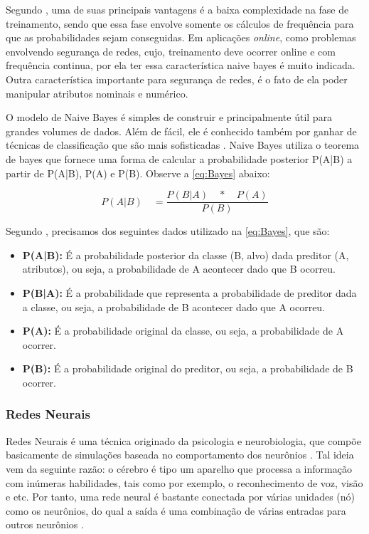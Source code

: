 \par
Segundo \cite{Henke2011}, uma de suas principais vantagens é a baixa complexidade na fase de treinamento, sendo que essa fase envolve somente os cálculos de frequência para que as probabilidades sejam conseguidas. Em aplicações \textit{online}, como problemas envolvendo segurança de redes, cujo, treinamento deve ocorrer online e com frequência continua, por ela ter essa característica naive bayes é muito indicada. Outra característica importante para segurança de redes, é o fato de ela poder manipular atributos nominais e numérico.

\par
O modelo de Naive Bayes é simples de construir e principalmente útil para grandes volumes de dados. Além de fácil, ele é conhecido também por ganhar de técnicas de classificação que são mais sofisticadas \cite{Sunil}. Naive Bayes utiliza o teorema de bayes que fornece uma forma de calcular a probabilidade posterior P(A|B) a partir de  P(A|B), P(A) e P(B). Observe a \autoref{eq:Bayes} abaixo:

\begin{equation}
    \label{eq:Bayes}
        {P(A|B)\quad =\frac { P(B|A)\quad *\quad P(A) }{ P(B) } }
\end{equation}

\par
Segundo , precisamos dos seguintes dados utilizado na \autoref{eq:Bayes}, que são:
\begin{itemize}
    \item \textbf{P(A|B):} É a probabilidade posterior da classe (B, alvo) dada preditor (A, atributos), ou seja, a probabilidade de A acontecer dado que B ocorreu.
    \item \textbf{P(B|A):} É a probabilidade que representa a probabilidade de preditor dada a classe, ou seja, a probabilidade de B acontecer dado que A ocorreu.
    \item \textbf{P(A):} É a probabilidade original da classe, ou seja, a probabilidade de A ocorrer.
     \item \textbf{P(B):} É a probabilidade original do preditor, ou seja, a probabilidade de B ocorrer.
\end{itemize}

\subsubsection{Redes Neurais}

\par
Redes Neurais é uma técnica originado da psicologia e neurobiologia, que compõe basicamente de simulações baseada no comportamento dos neurônios \cite{Camilo2009}. Tal ideia vem da seguinte razão: o cérebro é tipo um aparelho que processa a informação com inúmeras habilidades, tais como por exemplo, o reconhecimento de voz, visão e etc. Por tanto, uma rede neural é bastante conectada por várias unidades (nó) como os neurônios, do qual a saída é uma combinação de várias entradas para outros neurônios \cite{Henke2011, Barros2012}.

